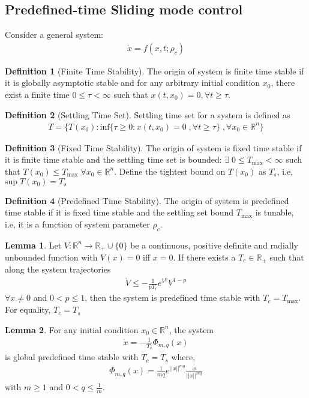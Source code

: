\documentclass[]{article}
\theoremstyle{remark}
\theoremstyle{definition}
\newtheorem{definition}{Definition}
\newtheorem{lemma}{Lemma}
\begin{document}
	\subsection{Predefined-time Sliding mode control}
	Consider a general system:
	\begin{align}
		\dot x = f(x,t;\rho_c)
	\end{align}
	\begin{definition}[Finite Time Stability] The origin of system is finite time stable if it is globally asymptotic stable and for any arbitrary initial condition $x_0$, there exist a finite time $0\leq\tau< \infty$ such that $x(t,x_0) = 0, \forall t\geq\tau$.    
	\end{definition}
	\begin{definition}[Settling Time Set] Settling time set for a system is defined as \begin{align}
			T = \{T(x_0): \text{inf}\{\tau\geq0 : x(t,x_0) = 0\; ,\forall t\geq\tau \}
			\;,\forall x_0\in \mathbb{R}^n  \}
		\end{align}    
	\end{definition}
	\begin{definition}[Fixed Time Stability] The origin of system is fixed time stable if it is finite time stable and the settling time set is bounded: $\exists \;0\leq T_{\text{max}}< \infty$ such that $ T(x_0) \leq T_{\text{max}} \; \forall x_0 \in \mathbb{R}^n$.  Define the tightest bound on $ T(x_0) $ as $ T_s $, i.e, $ \text{sup}\; T(x_0) = T_s $ 
	\end{definition}
	\begin{definition}[Predefined Time Stability]
		The origin of system is predefined time stable if it is fixed time stable and the settling set bound $T_{\text{max}}$ is tunable, i.e, it is a function of system parameter $\rho_c$.
	\end{definition}
	\begin{lemma}
		Let $V:\mathbb{R}^n \to \mathbb{R}_{+}\cup \{0\}$ be a continuous, positive definite and radially unbounded function with $ V(x) = 0 $ iff $ x = 0 $. If there exists a $ T_c \in \mathbb{R_{+}}$ such that along the system trajectories \begin{align}
			\dot V \leq -\frac{1}{pT_c}e^{V^p}V^{1-p} 
			\end{align} 
		$ \forall x \neq 0 $ and $ 0<p\leq 1 $, then the system is predefined time stable with $ T_c = T_{\text{max}} $. For equality, $ T_c = T_s $
	\end{lemma}
\begin{lemma}
	For any initial condition $ x_0 \in \mathbb{R}^n $, the system \begin{align}
		\dot x = -\frac{1}{T_c}\Phi_{m,q}(x)
	\end{align}
is global predefined time stable with $ T_c = T_s $ where, \begin{align}
	\Phi_{m,q}(x) = \frac{1}{mq}e^{||x||^{mq}}\frac{x}{||x||^{mq}} 
\end{align}
with $ m\geq1 $ and $ 0<q\leq\frac{1}{m} $.
\end{lemma}
\end{document}
